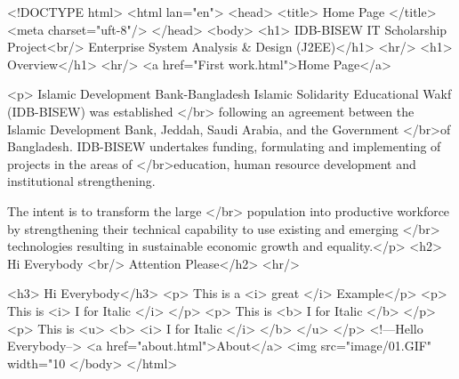 <!DOCTYPE html>
<html lan="en">
	<head>
		<title> Home Page </title>	
			<meta charset="uft-8"/>
	</head>
		<body>
			<h1> IDB-BISEW IT Scholarship Project<br/> Enterprise System Analysis & Design (J2EE)</h1>
<hr/>
			<h1> Overview</h1>
<hr/>
			<a href="First work.html">Home Page</a>
			
			<p> Islamic Development Bank-Bangladesh Islamic Solidarity Educational Wakf (IDB-BISEW) was established </br> following an agreement between the Islamic Development Bank, Jeddah, Saudi Arabia, and the Government </br>of Bangladesh. IDB-BISEW undertakes funding, formulating and implementing of projects in the areas of </br>education, human resource development and institutional strengthening.

The intent is to transform the large </br> population into productive workforce by strengthening their technical capability to use existing and emerging </br> technologies resulting in sustainable economic growth and equality.</p>
				<h2> Hi Everybody <br/> Attention Please</h2>
<hr/>

			<h3> Hi Everybody</h3>
			<p> This is a <i> great </i> Example</p>
			<p> This is <i> I for Italic </i> </p>
			<p> This  is <b> I for Italic </b> </p>
			<p> This is <u> <b> <i> I for Italic </i> </b> </u> </p>
			<!---Hello Everybody-->
			<a href="about.html">About</a>
			<img src="image/01.GIF" width="10%
		</body>
</html>
